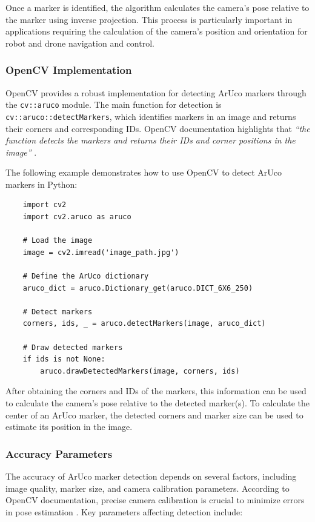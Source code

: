     Once a marker is identified, the algorithm calculates the camera's pose relative to the marker using inverse projection. This process is particularly important in applications requiring the calculation of the camera's position and orientation for robot and drone navigation and control.

    \subsubsection{OpenCV Implementation}

    OpenCV provides a robust implementation for detecting ArUco markers through the \texttt{cv::aruco} module. The main function for detection is \texttt{cv::aruco::detectMarkers}, which identifies markers in an image and returns their corners and corresponding IDs. OpenCV documentation highlights that \textit{“the function detects the markers and returns their IDs and corner positions in the image”} \cite{opencv_tutorial_aruco}.

    The following example demonstrates how to use OpenCV to detect ArUco markers in Python:

    \begin{verbatim}
    import cv2
    import cv2.aruco as aruco

    # Load the image
    image = cv2.imread('image_path.jpg')

    # Define the ArUco dictionary
    aruco_dict = aruco.Dictionary_get(aruco.DICT_6X6_250)

    # Detect markers
    corners, ids, _ = aruco.detectMarkers(image, aruco_dict)

    # Draw detected markers
    if ids is not None:
        aruco.drawDetectedMarkers(image, corners, ids)
    \end{verbatim}

    After obtaining the corners and IDs of the markers, this information can be used to calculate the camera's pose relative to the detected marker(s). To calculate the center of an ArUco marker, the detected corners and marker size can be used to estimate its position in the image.

    \subsubsection{Accuracy Parameters}

    The accuracy of ArUco marker detection depends on several factors, including image quality, marker size, and camera calibration parameters. According to OpenCV documentation, precise camera calibration is crucial to minimize errors in pose estimation \cite{opencv_docs_aruco}. Key parameters affecting detection include:

